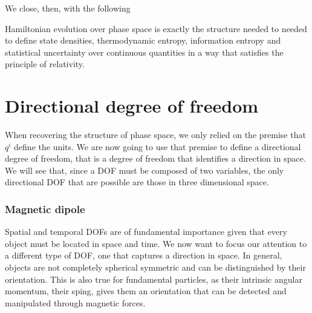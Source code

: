 We close, then, with the following
\begin{insight}
	Hamiltonian evolution over phase space is exactly the structure needed to needed to define state densities, thermodynamic entropy, information entropy and statistical uncertainty over continuous quantities in a way that satisfies the principle of relativity.
\end{insight}

\section{Directional degree of freedom}

When recovering the structure of phase space, we only relied on the premise that $q^i$ define the units. We are now going to use that premise to define a directional degree of freedom, that is a degree of freedom that identifies a direction in space. We will see that, since a DOF must be composed of two variables, the only directional DOF that are possible are those in three dimensional space.

\subsubsection{Magnetic dipole}

Spatial and temporal DOFs are of fundamental importance given that every object must be located in space and time. We now want to focus our attention to a different type of DOF, one that captures a direction in space. In general, objects are not completely spherical symmetric and can be distinguished by their orientation. This is also true for fundamental particles, as their intrinsic angular momentum, their sping, gives them an orientation that can be detected and manipulated through magnetic forces.

